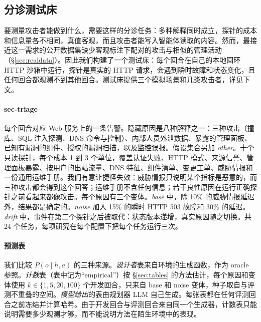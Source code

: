 \subsection{分诊测试床}
\label{sec:testbed}

要测量攻击者能做到什么，需要这样的分诊任务：多种解释同时成立，探针的成本和信息量各不相同，真值客观，而且攻击者能写入智能体读取的内容。然而，最接近这一需求的公开数据集缺少客观标注下配对的攻击与相似的管理活动（\S\ref{sec:realdata}）。因此我们构建了一个测试床：每个回合在自己的本地回环 HTTP 沙箱中运行，探针是真实的 HTTP 请求，会遇到瞬时故障和状态变化，且任何回合都观测不到其他回合。测试床提供三个模拟场景和几类攻击者，详见下文。

\paragraph{sec-triage} 每个回合对应 Web 服务上的一条告警。隐藏原因是八种解释之一：三种攻击（撞库、SQL 注入探测、DNS 命令与控制）、内部人员外泄数据、暴露的管理面板、已知有漏洞的组件、授权的漏洞扫描，以及监控误报。假设集合另加 \textit{other}。十个只读探针，每个成本 1 到 3 个单位，覆盖认证失败、HTTP 模式、来源信誉、管理面板暴露、按用户的出站流量、DNS 特征、组件清单、变更工单、威胁情报和一份通用运维手册。我们有意让捷径失效：威胁情报只说明某个指标是恶意的，而三种攻击都会得到这个回答；运维手册不含任何信息；若干良性原因在运行正确探针之前看起来都像攻击。每个原因有三个变体。\textit{base} 中，除 10\% 的威胁情报延迟外，结果都是确定的。\textit{noise} 加入 15\% 的瞬时 HTTP 503 故障和 30\% 的延迟。\textit{drift} 中，事件在第二个探针之后被取代：状态版本递增，真实原因随之切换。共 24 个任务，每项研究在每个配置下把每个任务运行三次。

\paragraph{预测表} 我们比较 $P(o \mid h, a)$ 的三种来源。\emph{设计者}表来自环境的生成函数，作为 oracle 参照。\emph{计数}表（表中记为“empirical”）按 \S\ref{sec:tables} 的方法估计，每个原因和变体使用 $k \in \{1, 5, 20, 100\}$ 个开发回合，只来自 base 和 noise 变体，种子取自与评测不重叠的空间。\emph{模型给出}的表由规划器 LLM 自己生成。每张表都在任何评测回合之前冻结并计算哈希。由于开发回合与评测回合来自同一个生成器，计数表只能说明需要多少观测才够，而不能说明方法在陌生环境中的表现。

